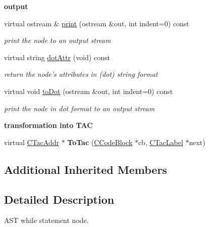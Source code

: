 \begin{Indent}{\bf output}\par
\begin{DoxyCompactItemize}
\item 
virtual ostream \& \hyperlink{classCAstStatWhile_a1ec900505fad4cb450b3b3455c7aae5e}{print} (ostream \&out, int indent=0) const 
\begin{DoxyCompactList}\small\item\em print the node to an output stream \end{DoxyCompactList}\item 
virtual string \hyperlink{classCAstStatWhile_a1fedefca201ad200cd23e6eab9a4e5e0}{dot\-Attr} (void) const 
\begin{DoxyCompactList}\small\item\em return the node's attributes in (dot) string format \end{DoxyCompactList}\item 
virtual void \hyperlink{classCAstStatWhile_ae80b4f2dc7e99b663eb7e802551964c7}{to\-Dot} (ostream \&out, int indent=0) const 
\begin{DoxyCompactList}\small\item\em print the node in dot format to an output stream \end{DoxyCompactList}\end{DoxyCompactItemize}
\end{Indent}
\begin{Indent}{\bf transformation into T\-A\-C}\par
\begin{DoxyCompactItemize}
\item 
\hypertarget{classCAstStatWhile_a978aa641c4fc53026fd450c9edb65250}{virtual \hyperlink{classCTacAddr}{C\-Tac\-Addr} $\ast$ {\bfseries To\-Tac} (\hyperlink{classCCodeBlock}{C\-Code\-Block} $\ast$cb, \hyperlink{classCTacLabel}{C\-Tac\-Label} $\ast$next)}\label{classCAstStatWhile_a978aa641c4fc53026fd450c9edb65250}

\end{DoxyCompactItemize}
\end{Indent}
\subsection*{Additional Inherited Members}


\subsection{Detailed Description}
A\-S\-T while statement node. 

